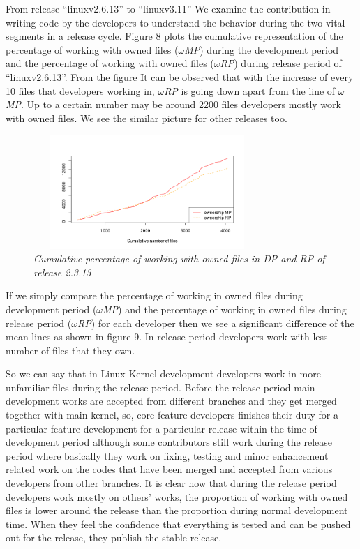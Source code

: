 \documentclass{acm_proc_article-sp}
\begin{document}
From release ``linuxv2.6.13'' to ``linuxv3.11'' We examine the contribution in writing code by the developers to understand the behavior during the two vital segments in a release cycle. Figure 8 plots the cumulative representation of the percentage of working with owned files ($\omega$\textit{MP}) during the development period and the percentage of working with owned files ($\omega$\textit{RP}) during release period of ``linuxv2.6.13''. From the figure It can be observed that with the increase of every 10 files that developers working in, $\omega$\textit{RP} is going down apart from the line of $\omega$\textit{MP}. Up to a certain number may be around 2200 files developers mostly work with owned files. We see the similar picture for other releases too.
\begin{figure}
\begin{center}
\includegraphics[height=1.7in,width=3.4in]{cumulFileOwnP.png}
\caption{\small \sl Cumulative percentage of working with owned files in DP and RP of release 2.3.13}
\end{center}
\end{figure}

If we simply compare the percentage of working in owned files during development period ($\omega$\textit{MP}) and the percentage of working in owned files during release period ($\omega$\textit{RP}) for each developer then we see a significant difference of the mean lines as shown in figure 9. In release period developers work with less number of files that they own.

So we can say that in Linux Kernel development developers work in more unfamiliar files during the release period. Before the release period main development works are accepted from different branches and they get merged together with main kernel, so, core feature developers finishes their duty for a particular feature development for a particular release within the time of development period although some contributors still work during the release period where basically they work on fixing, testing and minor enhancement related work on the codes that have been merged and accepted from various developers from other branches. It is clear now that during the release period developers work mostly on others' works, the proportion of working with owned files is lower around the release than the proportion during normal development time. When they feel the confidence that everything is tested and can be pushed out for the release, they publish the stable release.
\end{document}
